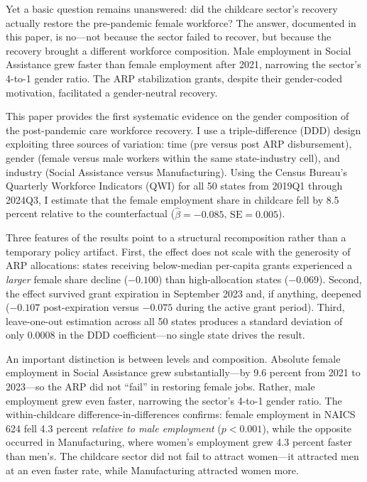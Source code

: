 \documentclass[12pt]{article}
\begin{document}
Yet a basic question remains unanswered: did the childcare sector's recovery actually restore the pre-pandemic female workforce? The answer, documented in this paper, is no---not because the sector failed to recover, but because the recovery brought a different workforce composition. Male employment in Social Assistance grew faster than female employment after 2021, narrowing the sector's 4-to-1 gender ratio. The ARP stabilization grants, despite their gender-coded motivation, facilitated a gender-neutral recovery.

This paper provides the first systematic evidence on the gender composition of the post-pandemic care workforce recovery. I use a triple-difference (DDD) design exploiting three sources of variation: time (pre versus post ARP disbursement), gender (female versus male workers within the same state-industry cell), and industry (Social Assistance versus Manufacturing). Using the Census Bureau's Quarterly Workforce Indicators (QWI) for all 50 states from 2019Q1 through 2024Q3, I estimate that the female employment share in childcare fell by 8.5 percent relative to the counterfactual ($\hat{\beta} = -0.085$, $\text{SE} = 0.005$).

Three features of the results point to a structural recomposition rather than a temporary policy artifact. First, the effect does not scale with the generosity of ARP allocations: states receiving below-median per-capita grants experienced a \emph{larger} female share decline ($-0.100$) than high-allocation states ($-0.069$). Second, the effect survived grant expiration in September 2023 and, if anything, deepened ($-0.107$ post-expiration versus $-0.075$ during the active grant period). Third, leave-one-out estimation across all 50 states produces a standard deviation of only 0.0008 in the DDD coefficient---no single state drives the result.

An important distinction is between levels and composition. Absolute female employment in Social Assistance grew substantially---by 9.6 percent from 2021 to 2023---so the ARP did not ``fail'' in restoring female jobs. Rather, male employment grew even faster, narrowing the sector's 4-to-1 gender ratio. The within-childcare difference-in-differences confirms: female employment in NAICS 624 fell 4.3 percent \emph{relative to male employment} ($p < 0.001$), while the opposite occurred in Manufacturing, where women's employment grew 4.3 percent faster than men's. The childcare sector did not fail to attract women---it attracted men at an even faster rate, while Manufacturing attracted women more.
\end{document}
